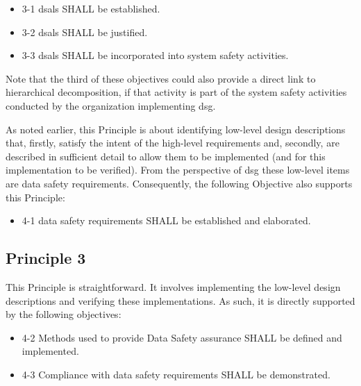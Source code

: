 \begin{itemize}
	\item \textcolor{dsiwgAccentColour}{3-1} \Glspl{dsal} SHALL be established.
	\item \textcolor{dsiwgAccentColour}{3-2} \Glspl{dsal} SHALL be justified.
	\item \textcolor{dsiwgAccentColour}{3-3} \Glspl{dsal} SHALL be incorporated into system safety activities.
\end{itemize}

Note that the third of these objectives could also provide a direct link to hierarchical decomposition, if that activity is part of the system safety activities conducted by the organization implementing \gls{dsg}.

As noted earlier, this Principle is about identifying low-level design descriptions that, firstly, satisfy the intent of the high-level requirements and, secondly, are described in sufficient detail to allow them to be implemented (and for this implementation to be verified). From the perspective of \gls{dsg} these low-level items are \glspl{data safety requirement}. Consequently, the following Objective also supports this Principle:

\begin{itemize}
	\item \textcolor{dsiwgAccentColour}{4-1} \Glspl{data safety requirement} SHALL be established and elaborated.
\end{itemize}


\subsection{Principle 3}

This Principle is straightforward. It involves implementing the low-level design descriptions and verifying these implementations. As such, it is directly supported by the following objectives:

\begin{itemize}
	\item \textcolor{dsiwgAccentColour}{4-2} Methods used to provide Data Safety assurance SHALL be defined and implemented.
	\item \textcolor{dsiwgAccentColour}{4-3} Compliance with \glspl{data safety requirement} SHALL be demonstrated.	
\end{itemize}


